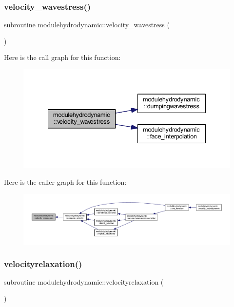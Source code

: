 \subsubsection{\texorpdfstring{velocity\+\_\+wavestress()}{velocity\_wavestress()}}
{\footnotesize\ttfamily subroutine modulehydrodynamic\+::velocity\+\_\+wavestress (\begin{DoxyParamCaption}{ }\end{DoxyParamCaption})\hspace{0.3cm}{\ttfamily [private]}}

Here is the call graph for this function\+:\nopagebreak
\begin{figure}[H]
\begin{center}
\leavevmode
\includegraphics[width=334pt]{namespacemodulehydrodynamic_ad5e5fda7c09616794f5a3e2d1a317161_cgraph}
\end{center}
\end{figure}
Here is the caller graph for this function\+:\nopagebreak
\begin{figure}[H]
\begin{center}
\leavevmode
\includegraphics[width=350pt]{namespacemodulehydrodynamic_ad5e5fda7c09616794f5a3e2d1a317161_icgraph}
\end{center}
\end{figure}
\mbox{\label{namespacemodulehydrodynamic_a3011a9be54d29dbb8d387a2253b36ab3}} 
\subsubsection{\texorpdfstring{velocityrelaxation()}{velocityrelaxation()}}
{\footnotesize\ttfamily subroutine modulehydrodynamic\+::velocityrelaxation (\begin{DoxyParamCaption}{ }\end{DoxyParamCaption})\hspace{0.3cm}{\ttfamily [private]}}

